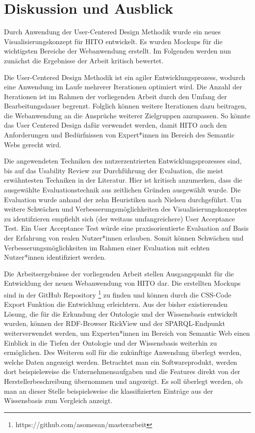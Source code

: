 \chapter{Diskussion und Ausblick}\label{ch:discussion}
Durch Anwendung der User-Centered Design Methodik wurde ein neues Visualisierungskonzept für HITO entwickelt.
Es wurden \newline Mockups für die wichtigsten Bereiche der Webanwendung erstellt.
Im Folgenden werden nun zunächst die Ergebnisse der Arbeit kritisch bewertet.

Die User-Centered Design Methodik ist ein agiler Entwicklungsprozess, wodurch eine Anwendung im Laufe mehrerer Iterationen optimiert wird.
Die Anzahl der Iterationen ist im Rahmen der vorliegenden Arbeit durch den Umfang der Bearbeitungsdauer begrenzt.
Folglich können weitere Iterationen dazu beitragen, die Webanwendung an die Ansprüche weiterer Zielgruppen anzupassen.
So könnte das User Centered Design dafür verwendet werden, damit HITO auch den Anforderungen und Bedürfnissen von Expert*innen im Bereich des Semantic Webs gerecht wird.

Die angewendeten Techniken des nutzerzentrierten Entwicklungsprozesses sind, bis auf das Usability Review zur Durchführung der Evaluation, die meist erwähntesten Techniken in der Literatur. \citep[vgl.]{salinas_2020}
Hier ist kritisch anzumerken, dass die ausgewählte Evaluationstechnik aus zeitlichen Gründen ausgewählt wurde.
Die Evaluation wurde anhand der zehn Heuristiken nach Nielsen durchgeführt.
Um weitere Schwächen und Verbesserungsmöglichkeiten des Visualisierungskonzeptes zu identifzieren empfiehlt sich (der weitaus umfangreichere) User Acceptance Test. Ein User Acceptance Test würde eine praxisorientierte Evaluation auf Basis der Erfahrung von realen Nutzer*innen erlauben.
Somit können Schwächen und Verbesserungsmöglichkeiten im Rahmen einer Evaluation mit echten Nutzer*innen identifiziert werden.

Die Arbeitsergebnisse der vorliegenden Arbeit stellen Ausgangspunkt für die Entwicklung der neuen Webanwendung von HITO dar.
Die erstellten Mockups sind in der GitHub Repository \footnote{https://github.com/asomesan/masterarbeit} zu finden und können durch die CSS-Code Export Funktion die Entwicklung erleichtern.
Aus der bisher existierenden Lösung, die für die Erkundung der Ontologie und der Wissensbasis entwickelt wurden, können der RDF-Browser RickView und der SPARQL-Endpunkt weiterverwendet werden, um Experten*innen im Bereich von Semantic Web einen Einblick in die Tiefen der Ontologie und der Wissensbasis weiterhin zu ermöglichen.
Des Weiteren soll für die zukünftige Anwendung überlegt werden, welche Daten angezeigt werden.
Betrachtet man ein Softwareprodukt, werden dort beispielsweise die Unternehmensaufgaben und die Features direkt von der Herstellerbeschreibung übernommen und angezeigt.
Es soll überlegt werden, ob man an dieser Stelle beispielsweise die klassifizierten Einträge aus der Wissensbasis zum Vergleich anzeigt.

